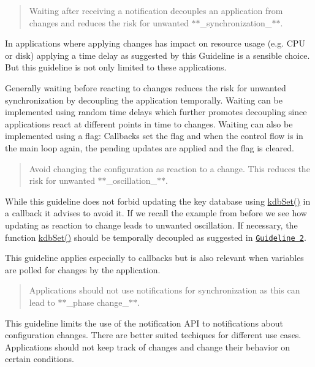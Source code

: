 \begin{quote}
Waiting after receiving a notification decouples an application from changes and reduces the risk for unwanted $\ast$$\ast$\+\_\+synchronization\+\_\+$\ast$$\ast$. \end{quote}


In applications where applying changes has impact on resource usage (e.\+g. C\+PU or disk) applying a time delay as suggested by this Guideline is a sensible choice. But this guideline is not only limited to these applications.

Generally waiting before reacting to changes reduces the risk for unwanted synchronization by decoupling the application temporally. Waiting can be implemented using random time delays which further promotes decoupling since applications react at different points in time to changes. Waiting can also be implemented using a flag\+: Callbacks set the flag and when the control flow is in the main loop again, the pending updates are applied and the flag is cleared.

\begin{quote}
Avoid changing the configuration as reaction to a change. This reduces the risk for unwanted $\ast$$\ast$\+\_\+oscillation\+\_\+$\ast$$\ast$. \end{quote}


While this guideline does not forbid updating the key database using {\ttfamily \hyperlink{group__kdb_ga11436b058408f83d303ca5e996832bcf}{kdb\+Set()}} in a callback it advises to avoid it. If we recall the example from before we see how updating as reaction to change leads to unwanted oscillation. If necessary, the function {\ttfamily \hyperlink{group__kdb_ga11436b058408f83d303ca5e996832bcf}{kdb\+Set()}} should be temporally decoupled as suggested in \href{#guideline-2-wait-before-reacting-to-changes}{\tt Guideline 2}.

This guideline applies especially to callbacks but is also relevant when variables are polled for changes by the application.

\begin{quote}
Applications should not use notifications for synchronization as this can lead to $\ast$$\ast$\+\_\+phase change\+\_\+$\ast$$\ast$. \end{quote}


This guideline limits the use of the notification A\+PI to notifications about configuration changes. There are better suited techiques for different use cases. Applications should not keep track of changes and change their behavior on certain conditions.

